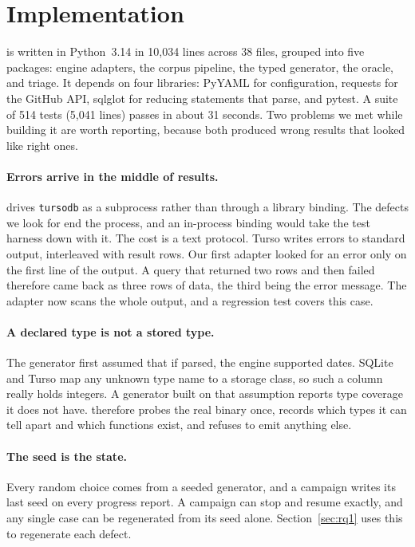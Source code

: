 \section{Implementation}
\label{sec:impl}

\tool is written in Python~3.14 in 10{,}034 lines across 38 files, grouped
into five packages: engine adapters, the corpus pipeline, the typed generator,
the oracle, and triage. It depends on four libraries: PyYAML for configuration,
requests for the GitHub API, sqlglot for reducing statements that parse, and
pytest. A suite of 514 tests (5{,}041 lines) passes in about 31 seconds. Two
problems we met while building it are worth reporting, because both produced
wrong results that looked like right ones.

\paragraph{Errors arrive in the middle of results.} \tool drives
\texttt{tursodb} as a subprocess rather than through a library binding. The
defects we look for end the process, and an in-process binding would take the
test harness down with it. The cost is a text protocol. Turso writes errors to
standard output, interleaved with result rows. Our first adapter looked for an
error only on the first line of the output. A query that returned two rows and
then failed therefore came back as three rows of data, the third being the error
message. The adapter now scans the whole output, and a regression test covers
this case.

\paragraph{A declared type is not a stored type.} The generator first assumed
that if  parsed, the engine supported dates. SQLite
and Turso map any unknown type name to a storage class, so such a column really
holds integers. A generator built on that assumption reports type coverage it
does not have. \tool therefore probes the real binary once, records which types
it can tell apart and which functions exist, and refuses to emit anything else.

\paragraph{The seed is the state.} Every random choice comes from a seeded
generator, and a campaign writes its last seed on every progress report. A
campaign can stop and resume exactly, and any single case can be regenerated
from its seed alone. Section~\ref{sec:rq1} uses this to regenerate each defect.
